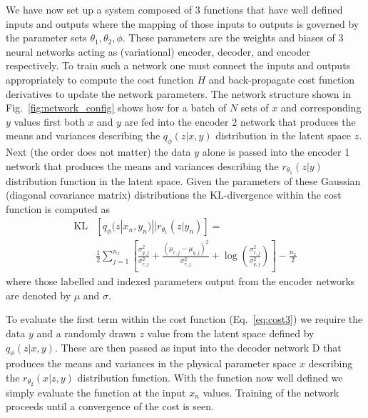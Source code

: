 \documentclass[%
showpacs,
 amsmath,amssymb,
 aps,
 twocolumn,
 prl,
 reprint,
floatfix,
]{revtex4-1}
\begin{document}
We have now set up a system composed of 3 functions that have well defined
inputs and outputs where the mapping of those inputs to outputs is governed by
the parameter sets $\theta_{1},\theta_{2},\phi$. These parameters are the
weights and biases of 3 neural networks acting as (variational) encoder,
decoder, and encoder respectively. To train such a network one must connect the
inputs and outputs appropriately to compute the cost function $H$ and
back-propagate cost function derivatives to update the network parameters. The
network structure shown in Fig.~\ref{fig:network_config} shows how for a batch
of $N$ sets of $x$ and corresponding $y$ values first both $x$ and $y$ are fed
into the encoder 2 network that produces the means and variances describing the
$q_{\phi}(z|x,y)$ distribution in the latent space $z$. Next (the order does
not matter) the data $y$ alone is passed into the encoder 1 network that
produces the means and variances describing the $r_{\theta_{1}}(z|y)$
distribution function in the latent space. Given the parameters of these
Gaussian (diagonal covariance matrix) distributions the $\text{KL}$-divergence
within the cost function is computed as
%
\begin{align}\label{eq:klgauss}
\text{KL}&\left[q_{\phi}(z|x_{n},y_{n})||r_{\theta_{1}}(z|y_{n})\right] = \\
&\frac{1}{2}\sum_{j=1}^{n_{z}}\left[\frac{\sigma_{q,j}^{2}}{\sigma_{r,j}^{2}} +
\frac{(\mu_{r,j}-\mu_{q,j})^{2}}{\sigma_{r,j}^{2}}+
\log\left(\frac{\sigma_{r,j}^{2}}{\sigma_{q,j}^{2}}\right)\right] -
\frac{n_{z}}{2}\nonumber \end{align}
%
where those labelled and indexed parameters output from the encoder networks
are denoted by $\mu$ and $\sigma$.

To evaluate the first term within the cost function (Eq.~\ref{eq:cost3}) we
require the data $y$ and a randomly drawn $z$ value from the latent space defined
by $q_{\phi}(z|x,y)$. These are then passed as input into the decoder network D
that produces the means and variances in the physical parameter space $x$ describing
the $r_{\theta_{2}}(x|z,y)$ distribution function. With the function now well
defined we simply evaluate the function at the input $x_{n}$
values. Training of the network proceeds until a convergence of the cost is
seen. 
\end{document}

